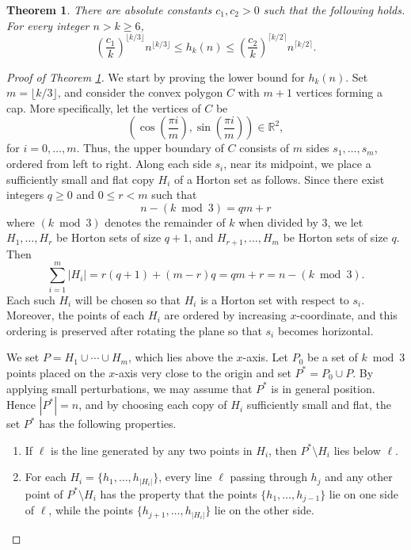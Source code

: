 \documentclass[10pt,a4paper]{amsart}
\newtheorem{theorem}{Theorem}
\begin{document}
\begin{theorem}\label{hole1}
There are absolute constants $c_1,c_2>0$ such that the following holds. For every integer \(n>k\ge 6\),
\[
\left(\frac{c_1}{k}\right)^{\lfloor k/3\rfloor} n^{\lfloor k/3\rfloor}
\le h_k(n)\le
\left(\frac{c_2}{k}\right)^{\lceil k/2\rceil} n^{\lceil k/2\rceil}.
\]
\end{theorem}

\begin{proof}[Proof of Theorem \ref{hole1}] We start by proving the lower bound for $h_k(n)$.   Set \(m=\lfloor k/3\rfloor\), and consider the convex polygon \(C\) with \(m+1\) vertices forming a cap. More specifically, let the vertices of \(C\) be
\[
\left(\cos\left(\frac{\pi i}{m}\right),\sin\left(\frac{\pi i}{m}\right)\right)\in\mathbb{R}^2,
\]
for \(i=0,\ldots,m\). Thus, the upper boundary of \(C\) consists of \(m\) sides \(s_1,\ldots,s_m\), ordered from left to right.  Along each side \(s_i\), near its midpoint, we place a sufficiently small and flat copy \(H_i\) of a Horton set as follows.  Since there exist integers \(q\ge 0\) and \(0\le r<m\) such that
\[
n-(k\bmod 3)=q m+r
\]
where $(k\bmod 3)$ denotes the remainder of $k$ when divided by $3$, we let \(H_1,\dots,H_r\) be Horton sets of size \(q+1\), and \(H_{r+1},\dots,H_{m}\) be Horton sets of size \(q\). Then
\[
\sum_{i=1}^{m}|H_i|
=
r(q+1)+\left(m-r\right)q
=
qm+r
=
n-(k\bmod 3).
\]
Each such $H_i$ will be chosen so that \(H_i\) is a Horton set with respect to \(s_i\). Moreover, the points of each \(H_i\) are ordered by increasing \(x\)-coordinate, and this ordering is preserved after rotating the plane so that \(s_i\) becomes horizontal.




We set $P =  H_1\cup \cdots \cup H_m$, which lies above the $x$-axis. Let $P_0$ be a set of $k\bmod 3$ points placed on the $x$-axis very close to the origin and set $P^{\ast} = P_0\cup P$. By applying small perturbations, we may assume that $P^{\ast}$ is in general position. Hence $|P^{\ast}|=n$, and by choosing each copy of $H_i$ sufficiently small and flat, the set $P^{\ast}$ has the following properties.




\begin{enumerate}
    \item If $\ell$ is the line generated by any two points in $H_i$, then $P^{\ast}\setminus H_i$ lies below $\ell$.  

    
\item For each \(H_i=\{h_1,\ldots,h_{|H_i|}\}\), every line \(\ell\) passing through \(h_j\) and any other point of \(P^{\ast}\setminus H_i\) has the property that the points \(\{h_1,\ldots,h_{j-1}\}\) lie on one side of \(\ell\), while the points \(\{h_{j+1},\ldots,h_{|H_i|}\}\) lie on the other side.
\end{enumerate}






\end{proof}
\end{document}
